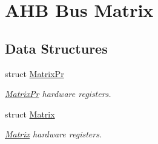 \hypertarget{group__SAME70__MATRIX}{}\section{A\+HB Bus Matrix}
\label{group__SAME70__MATRIX}
\subsection*{Data Structures}
\begin{DoxyCompactItemize}
\item 
struct \mbox{\hyperlink{structMatrixPr}{Matrix\+Pr}}
\begin{DoxyCompactList}\small\item\em \mbox{\hyperlink{structMatrixPr}{Matrix\+Pr}} hardware registers. \end{DoxyCompactList}\item 
struct \mbox{\hyperlink{structMatrix}{Matrix}}
\begin{DoxyCompactList}\small\item\em \mbox{\hyperlink{structMatrix}{Matrix}} hardware registers. \end{DoxyCompactList}\end{DoxyCompactItemize}
